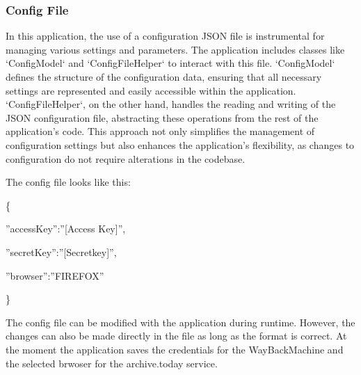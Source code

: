 \subsubsection{Config File}
In this application, the use of a configuration JSON file is instrumental for managing various settings and parameters. The application includes classes like `ConfigModel` and `ConfigFileHelper` to interact with this file. `ConfigModel` defines the structure of the configuration data, ensuring that all necessary settings are represented and easily accessible within the application. `ConfigFileHelper`, on the other hand, handles the reading and writing of the JSON configuration file, abstracting these operations from the rest of the application's code. This approach not only simplifies the management of configuration settings but also enhances the application's flexibility, as changes to configuration do not require alterations in the codebase.

The config file looks like this:

\{

\quad''accessKey'':''[Access Key]'',

\quad''secretKey'':''[Secretkey]'',

\quad''browser'':''FIREFOX''

\}


The config file can be modified with the application during runtime. However, the changes can also be made directly in the file as long as the format is correct.
At the moment the application saves the credentials for the WayBackMachine and the selected brwoser for the archive.today service.
\clearpage

